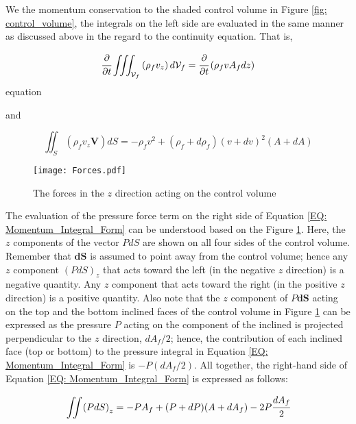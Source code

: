\documentclass[../Article_Design_of_Experiment.tex]{subfiles}
\begin{document}
	We the momentum conservation to the shaded control volume in Figure \ref{fig: control_volume}, the integrals on the left side are evaluated in the same manner as discussed above in the regard to the continuity equation. That is,
	
	{\footnotesize
		\begin{equation}
			\cfrac{\partial}{\partial t} \iiint_{\mathcal{V}_f} \left( \rho_f v_z \right) d \mathcal{V}_f = \cfrac{\partial}{\partial t} \left( \rho_f v A_f dz \right)
			\label{EQ: Force_Continuity_Monenmtum}
		\end{equation}equation
	}
	
	and 
	
	{\footnotesize
		\begin{equation}
			\iint_S \left( \rho_f v_z \textbf{V} \right) dS = -\rho_f v^2 + \left( \rho_f + d \rho_f \right) \left( v+dv \right)^2 \left( A+dA \right)
		\end{equation}
	}
	
	\begin{figure}[h]
		\centering
		\texttt{[image: Forces.pdf]}
		\caption{The forces in the $z$ direction acting on the control volume}
		\label{fig: Forces_Momentum_Control_Volume}
	\end{figure}
	
	The evaluation of the pressure force term on the right side of Equation \ref{EQ: Momentum_Integral_Form} can be understood based on the Figure \ref{fig: Forces_Momentum_Control_Volume}. Here, the $z$ components of the vector $PdS$ are shown on all four sides of the control volume. Remember that $\textbf{dS}$ is assumed to point away from the control volume; hence  any $z$ component $\left( PdS \right)_z$ that acts toward the left (in the negative $z$ direction) is a negative quantity. Any $z$ component that acts toward the right (in the positive $z$ direction) is a positive quantity. Also note that the $z$ component of $P\textbf{dS}$ acting on the top and the bottom inclined faces of the control volume in Figure \ref{fig: Forces_Momentum_Control_Volume} can be expressed as the pressure $P$ acting on the component of the inclined is projected perpendicular to the $z$ direction, $dA_f/2$; hence, the contribution of each inclined face (top or bottom) to the pressure integral in Equation \ref{EQ: Momentum_Integral_Form} is $-P(dA_f/2)$. All together, the right-hand side of Equation \ref{EQ: Momentum_Integral_Form} is expressed as follows:
	
	{\footnotesize
		\begin{equation}
			\iint \left( PdS \right)_z = -PA_f + (P+dP)(A+dA_f)-2P\cfrac{dA_f}{2}
			\label{EQ: Force_Integral_Varying_Cross_Section}
		\end{equation}
	}
	
\end{document}
